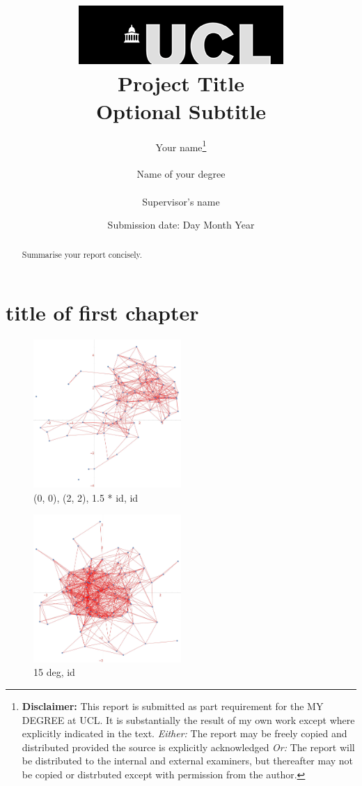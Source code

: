 \documentclass[12pt]{report}
\title{  	{ \includegraphics[scale=.5]{ucl_logo.png}}\\
{{\Huge Project Title}}\\
{\large Optional Subtitle}\\
		}
\date{Submission date: Day Month Year}
\author{Your name\thanks{
{\bf Disclaimer:}
This report is submitted as part requirement for the MY DEGREE at UCL. It is
substantially the result of my own work except where explicitly indicated in the text.
\emph{Either:} The report may be freely copied and distributed provided the source is explicitly acknowledged
\newline  %
\emph{Or:}\newline
The report will be distributed to the internal and external examiners, but thereafter may not be copied or distrbuted except with permission from the author.}
\\ \\
Name of your degree\\ \\
Supervisor's name}
\begin{document}
 
\maketitle
\begin{abstract}
Summarise your report concisely.
\end{abstract}
\tableofcontents
\setcounter{page}{1}


\chapter{title of first chapter}

\centering
\begin{table}
    \centering
    \tiny
\end{table}

\centering
\begin{table}
    \centering
    \tiny
\end{table}

\centering
\begin{table}
    \centering
    \tiny
\end{table}

\begin{figure}
    \centering
    \includegraphics[width = 0.5\textwidth]{gaussian_mixtures.jpg}
    \caption{(0, 0), (2, 2), 1.5 * id, id}
\end{figure}

\begin{figure}
    \centering
    \includegraphics[width = 0.5\textwidth]{multivariatet.jpg}
    \caption{15 deg, id}
\end{figure}
\end{document}
